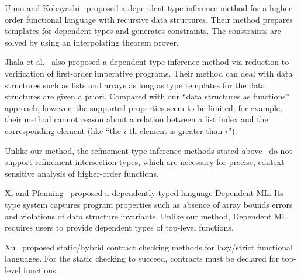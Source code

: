 
Unno and Kobayashi~\cite{Unno2009} proposed a dependent type inference 
method for a higher-order functional language with recursive data 
structures.  Their method prepares templates for dependent types and 
generates constraints.  The constraints are solved by using an 
interpolating theorem prover.

Jhala et al.~\cite{Jhala2011} also proposed a dependent type inference 
method via reduction to verification of first-order imperative programs.
Their method can deal with data structures such as lists and arrays as 
long as type templates for the data structures are given a priori.  
Compared with our ``data structures as functions'' approach, however, 
the supported properties seem to be limited; for example, their method 
cannot reason about a relation between a list index and the 
corresponding element (like ``the \(i\)-th element is greater than 
\(i\)'').

Unlike our method, the refinement type inference methods stated 
above~\cite{Rondon2008,Kawaguchi2009,Unno2009,Jhala2011} do not support 
refinement intersection types, which are necessary for precise, 
context-sensitive analysis of higher-order functions.

Xi and Pfenning~\cite{Xi1999} proposed a dependently-typed language 
Dependent ML.  Its type system captures program properties such as 
absence of array bounds errors and violations of data structure 
invariants.  Unlike our method, Dependent ML requires users to provide 
dependent types of top-level functions.

Xu~\cite{Xu2009,Xu2012} proposed static/hybrid contract checking methods 
for lazy/strict functional languages.  For the static checking to 
succeed, contracts must be declared for top-level functions.

